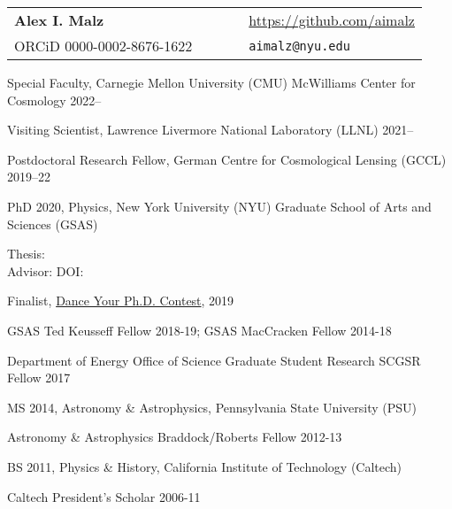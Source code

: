 \documentclass[11pt,letterpaper]{article}
\begin{document}
\sloppy\sloppypar\raggedbottom\frenchspacing
\setlength{\tabcolsep}{0.55cm}
\begin{tabular}{lllll}
\noindent\textbf{\Large Alex I. Malz}            & & %
& & {\url{https://github.com/aimalz}} \\%
\noindent ORCiD 0000-0002-8676-1622 & & %
& & \texttt{aimalz@nyu.edu}    
\end{tabular}\vspace{1ex} 

\begin{list}{}{\malzlist}
	\item Special Faculty, Carnegie Mellon University (CMU) McWilliams Center for Cosmology 2022--\\
	\item Visiting Scientist, Lawrence Livermore National Laboratory (LLNL) 2021--
	\item Postdoctoral Research Fellow, German Centre for Cosmological Lensing (GCCL) 2019--22
\end{list}%

\begin{list}{}{\malzlist}
\item
PhD 2020, Physics, New York University (NYU) Graduate School of Arts and Sciences (GSAS)
	\begin{list}{}{\malzlist}
		\item Thesis:  \\
		Advisor:  DOI: 
		\item Finalist, \href{https://youtu.be/vKs3PYqZWg8}{Dance Your Ph.D. Contest}, 2019
		\item GSAS Ted Keusseff Fellow 2018-19; GSAS MacCracken Fellow 2014-18
		\item
		Department of Energy Office of Science Graduate Student Research SCGSR Fellow 2017
	\end{list}{}
\item
MS 2014, Astronomy \& Astrophysics, Pennsylvania State University (PSU)
	\begin{list}{}{\malzlist}
		\item Astronomy \& Astrophysics Braddock/Roberts Fellow 2012-13
	\end{list}
\item
BS 2011, Physics \& History, California Institute of Technology (Caltech)
	\begin{list}{}{\malzlist}
		\item Caltech President's Scholar 2006-11
	\end{list}
\end{list}
\end{document}
